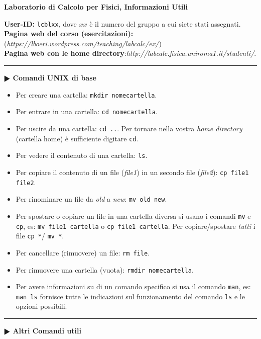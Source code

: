 \documentclass[11pt]{article}
\begin{document}
\pagestyle{empty}

\begin{center}
{\large \bf  Laboratorio di Calcolo per Fisici, Informazioni Utili\\[2mm]}
\end{center}

{\bf User-ID:} \texttt{lcblxx}, dove $xx$ \`e il numero del gruppo a cui siete stati assegnati.
\\
{\bf Pagina web del corso (esercitazioni):}
  ({\em https://lboeri.wordpress.com/teaching/labcalc/ex/})
\\
{\bf Pagina web con le home directory}:{\em  http://labcalc.fisica.uniroma1.it/studenti/}.
\vspace{2mm}
\hrule
\vspace{2mm}
\textbf{$\RHD$ Comandi UNIX di base}
\begin{itemize}
\item Per creare una cartella: \texttt{mkdir nomecartella}.
\item Per entrare in una cartella: \texttt{cd nomecartella}.
\item Per uscire da una cartella: \texttt{cd ..}. Per tornare nella vostra
  {\em home directory} (cartella home) \`e sufficiente digitare \texttt{cd}.
\item Per vedere il contenuto di una cartella: \texttt{ls}.
\item Per copiare il contenuto di un file ({\em file1}) in un secondo file
  ({\em file2}): \texttt{cp file1 file2}.
\item Per rinominare un file da {\em old} a {\em new}: \texttt{mv old new}.
\item Per spostare o copiare un file in una cartella diversa si usano i comandi \texttt{mv} e \texttt{cp}, es: \texttt{mv file1 cartella} o  \texttt{cp file1 cartella}. Per copiare/spostare {\em tutti} i file \texttt{cp *}/ \texttt{mv *}.
\item Per cancellare (rimuovere) un file: \texttt{rm file}.
\item Per rimuovere una cartella (vuota):  \texttt{rmdir nomecartella}.
 \item Per avere informazioni su di un comando specifico si usa il comando
  \texttt{man}, es:  \texttt{man ls} fornisce tutte le indicazioni sul funzionamento del comando \texttt{ls} e le opzioni possibili.
\end{itemize}
\hrule
\vspace{2mm}
\textbf{$\RHD$ Altri Comandi utili}
\end{document}
